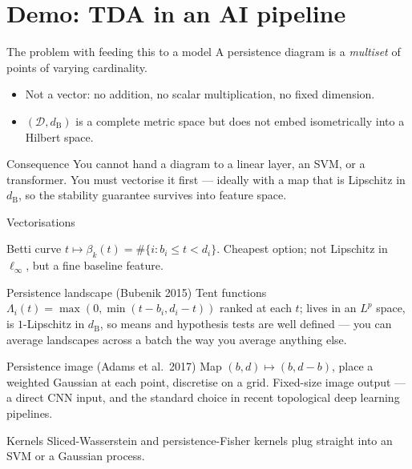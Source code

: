 \documentclass[10pt,aspectratio=169]{beamer}
\newcommand{\dB}{d_{\mathrm{B}}}
\newcommand{\HL}[1]{\textcolor{blue!70!black}{#1}}
\begin{document}
    \section{Demo: TDA in an AI pipeline}

    \begin{frame}{The problem with feeding this to a model}
        A persistence diagram is a \emph{multiset} of points of varying cardinality.

        \vspace{0.4em}
        \begin{itemize}
            \item Not a vector: no addition, no scalar multiplication, no fixed dimension.
            \item $(\mathcal D,\dB)$ is a complete metric space but does not embed
            isometrically into a Hilbert space.
        \end{itemize}

        \vspace{0.6em}

        \begin{alertblock}{Consequence}
            You cannot hand a diagram to a linear layer, an SVM, or a transformer. You must
            \HL{vectorise} it first --- ideally with a map that is Lipschitz in $\dB$, so the
            stability guarantee survives into feature space.
        \end{alertblock}
    \end{frame}

    \begin{frame}{Vectorisations}
        \small
        \begin{block}{Betti curve}
            $t\mapsto\beta_k(t)=\#\{i:b_i\le t<d_i\}$. Cheapest option; not Lipschitz in
            $\ell_\infty$, but a fine baseline feature.
        \end{block}
        \begin{block}{Persistence landscape (Bubenik 2015)}
            Tent functions $\Lambda_i(t)=\max(0,\min(t-b_i,d_i-t))$ ranked at each $t$; lives in
            an $L^p$ space, is $1$-Lipschitz in $\dB$, so means and hypothesis tests are well
            defined --- you can average landscapes across a batch the way you average anything else.
        \end{block}
        \begin{block}{Persistence image (Adams et al.\ 2017)}
            Map $(b,d)\mapsto(b,d-b)$, place a weighted Gaussian at each point, discretise on a
            grid. Fixed-size image output --- a direct CNN input, and the standard choice in
            recent \HL{topological deep learning} pipelines.
        \end{block}
        \begin{block}{Kernels}
            Sliced-Wasserstein and persistence-Fisher kernels plug straight into an SVM or a
            Gaussian process.
        \end{block}
    \end{frame}
\end{document}
